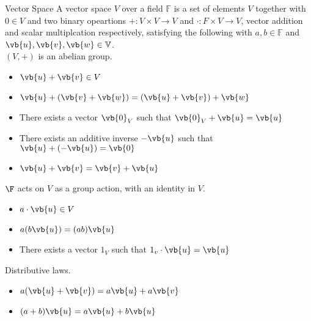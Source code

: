 \begin{defn}{Vector Space}{} A vector space $V$ over a field $\mathbb{F}$ is a set of elements $V$ together with $0\in V$ and two binary opeartions $+:V\times V\to V$ and $\cdot:F\times V\to V$, vector addition and scalar multiplcation respectively, satisfying the following with $a,b\in\mathbb{F}$ and $\vb{u},\vb{v},\vb{w}\in\mathbb{V}$. \\
$(V,+)$ is an abelian group. 
\begin{itemize}
\item $\vb{u}+\vb{v}\in V$
\item $\vb{u}+(\vb{v}+\vb{w})=(\vb{u}+\vb{v})+\vb{w}$
\item There exists a vector $\vb{0}_V$ such that $\vb{0}_V+\vb{u}=\vb{u}$
\item There exists an additive inverse $-\vb{u}$ such that $\vb{u}+(-\vb{u})=\vb{0}$
\item $\vb{u}+\vb{v}=\vb{v}+\vb{u}$
\end{itemize}
$\F$ acts on $V$ as a group action, with an identity in $V$. 
\begin{itemize}
\item $a\cdot \vb{u}\in V$
\item $a(b\vb{u})=(ab)\vb{u}$
\item There exists a vector $1_V$ such that $1_v\cdot \vb{u}=\vb{u}$
\end{itemize}
Distributive laws. 
\begin{itemize}
\item $a(\vb{u}+\vb{v})=a\vb{u}+a\vb{v}$
\item $(a+b)\vb{u}=a\vb{u}+b\vb{u}$
\end{itemize}
\end{defn}

